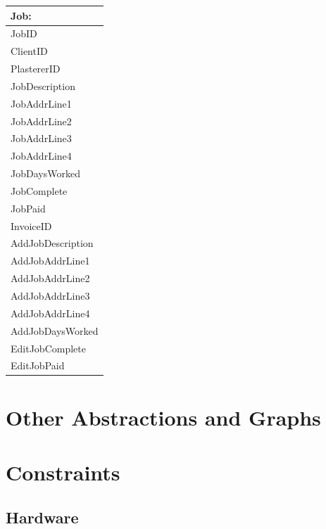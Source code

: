 \begin{tabular}{|p{5cm}|}
	\hline
	\textbf{Job:} \\ \hline
		JobID \\
		ClientID \\
		PlastererID \\
		JobDescription \\
		JobAddrLine1 \\
		JobAddrLine2 \\
		JobAddrLine3 \\
		JobAddrLine4 \\
		JobDaysWorked \\
		JobComplete \\
		JobPaid \\ 
		InvoiceID \\ \hline
		AddJobDescription\\
		AddJobAddrLine1 \\
		AddJobAddrLine2 \\
		AddJobAddrLine3 \\
		AddJobAddrLine4 \\
		AddJobDaysWorked \\
		EditJobComplete \\
		EditJobPaid \\ \hline
\end{tabular}





\section{Other Abstractions and Graphs}

\section{Constraints}

\subsection{Hardware}

